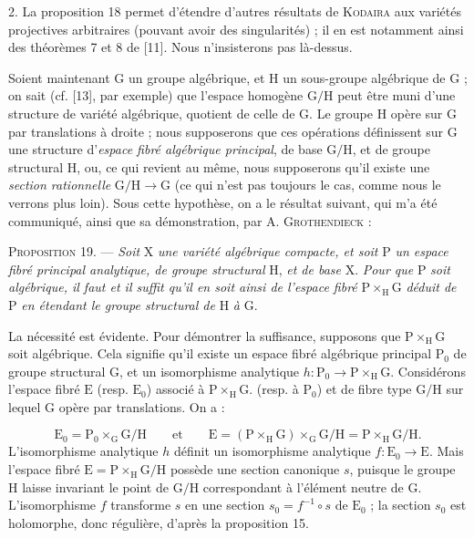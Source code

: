 2. La proposition 18 permet d'étendre d'autres résultats de \textsc{Kodaira} aux variétés projectives arbitraires (pouvant avoir des singularités) ; il en est notamment ainsi des théorèmes 7 et 8 de [11]. Nous n'insisterons pas là-dessus.

Soient maintenant $\mathrm{G}$ un groupe algébrique, et $\mathrm{H}$ un sous-groupe algébrique de $\mathrm{G}$ ; on sait (cf. [13], par exemple) que l'espace homogène $\mathrm{G}/\mathrm{H}$ peut être muni d'une structure de variété algébrique, quotient de celle de $\mathrm{G}$. Le groupe $\mathrm{H}$ opère sur $\mathrm{G}$ par translations à droite ; nous supposerons que ces opérations définissent sur $\mathrm{G}$ une structure d'\textit{espace fibré algébrique principal}, de base $\mathrm{G}/\mathrm{H}$, et de groupe structural $\mathrm{H}$, ou, ce qui revient au même, nous supposerons qu'il existe une \textit{section rationnelle} $\mathrm{G}/\mathrm{H} \to \mathrm{G}$ (ce qui n'est pas toujours le cas, comme nous le verrons plus loin). Sous cette hypothèse, on a le résultat suivant, qui m'a été communiqué, ainsi que sa démonstration, par A. \textsc{Grothendieck} :

\textsc{Proposition} 19. --- \textit{Soit} $\mathrm{X}$ \textit{une variété algébrique compacte, et soit} $\mathrm{P}$ \textit{un espace fibré principal analytique, de groupe structural} $\mathrm{H}$, \textit{et de base} $\mathrm{X}$. \textit{Pour que} $\mathrm{P}$ \textit{soit algébrique, il faut et il suffit qu'il en soit ainsi de l'espace fibré} $\mathrm{P} \times_{\mathrm{H}} \mathrm{G}$ \textit{déduit de} $\mathrm{P}$ \textit{en étendant le groupe structural de} $\mathrm{H}$ \textit{à} $\mathrm{G}$.



La nécessité est évidente. Pour démontrer la suffisance, supposons que $\mathrm{P} \times_{\mathrm{H}} \mathrm{G}$ soit algébrique. Cela signifie qu'il existe un espace fibré algébrique principal $\mathrm{P}_0$ de groupe structural $\mathrm{G}$, et un isomorphisme analytique $h : \mathrm{P}_0 \to \mathrm{P} \times_{\mathrm{H}} \mathrm{G}$. Considérons l'espace fibré $\mathrm{E}$ (resp. $\mathrm{E}_0$) associé à $\mathrm{P} \times_{\mathrm{H}} \mathrm{G}$. (resp. à $\mathrm{P}_0$) et de fibre type $\mathrm{G}/\mathrm{H}$ sur lequel $\mathrm{G}$ opère par translations. On a :

\begin{equation*}
\mathrm{E}_0 = \mathrm{P}_0 \times_{\mathrm{G}} \mathrm{G}/\mathrm{H} \qquad \mathrm{et} \qquad \mathrm{E} = (\mathrm{P} \times_{\mathrm{H}} \mathrm{G}) \times_{\mathrm{G}} \mathrm{G}/\mathrm{H} = \mathrm{P} \times_{\mathrm{H}} \mathrm{G}/\mathrm{H}.
\end{equation*}
L'isomorphisme analytique $h$ définit un isomorphisme analytique $f : \mathrm{E}_0 \to \mathrm{E}$. Mais l'espace fibré $\mathrm{E} = \mathrm{P} \times_{\mathrm{H}} \mathrm{G}/\mathrm{H}$ possède une section canonique $s$, puisque le groupe $\mathrm{H}$ laisse invariant le point de $\mathrm{G}/\mathrm{H}$ correspondant à l'élément neutre de $\mathrm{G}$. L'isomorphisme $f$ transforme $s$ en une section $s_0 = f^{-1} \circ s$ de $\mathrm{E}_0$ ; la section $s_0$ est holomorphe, donc régulière, d'après la proposition 15.

